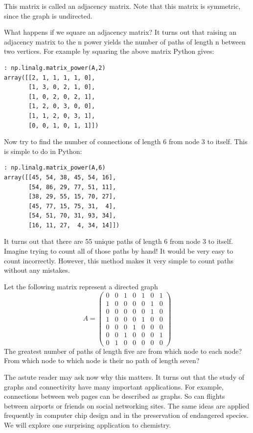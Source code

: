 This matrix is called an adjacency matrix. Note that this matrix is symmetric, since the graph is undirected.

What happens if we square an adjacency matrix? It turns out that raising an adjacency matrix to the n power yields the number of paths of length n between two vertices. For example by squaring the above matrix Python gives:
\begin{lstlisting}[style=python]
: np.linalg.matrix_power(A,2)
array([[2, 1, 1, 1, 1, 0],
       [1, 3, 0, 2, 1, 0],
       [1, 0, 2, 0, 2, 1],
       [1, 2, 0, 3, 0, 0],
       [1, 1, 2, 0, 3, 1],
       [0, 0, 1, 0, 1, 1]])
\end{lstlisting}

Now try to find the number of connections of length 6 from node 3 to itself. This is simple to do in Python:
\begin{lstlisting}[style=python]
: np.linalg.matrix_power(A,6)
array([[45, 54, 38, 45, 54, 16],
       [54, 86, 29, 77, 51, 11],
       [38, 29, 55, 15, 70, 27],
       [45, 77, 15, 75, 31,  4],
       [54, 51, 70, 31, 93, 34],
       [16, 11, 27,  4, 34, 14]])
\end{lstlisting}
It turns out that there are 55 unique paths of length 6 from node 3 to itself. Imagine trying to count all of those paths by hand! It would be very easy to count incorrectly. However, this method makes it very simple to count paths without any mistakes.

\begin{problem}
Let the following matrix represent a directed graph
\[
A = \begin{pmatrix}
0 & 0 & 1 & 0 & 1 & 0 & 1\\
1 & 0 & 0 & 0 & 0 & 1 & 0\\
0 & 0 & 0 & 0 & 0 & 1 & 0\\
1 & 0 & 0 & 0 & 1 & 0 & 0\\
0 & 0 & 0 & 1 & 0 & 0 & 0\\
0 & 0 & 1  & 0 & 0& 0 & 1\\
0 & 1 & 0 & 0 & 0 & 0 & 0
\end{pmatrix}
\]
The greatest number of paths of length five are from which node to each node? From which node to which node is their no path of length seven?
\end{problem}

The astute reader may ask now why this matters. It turns out that the study of graphs and connectivity have many important applications. For example, connections between web pages can be described as graphs. So can flights between airports or friends on social networking sites. The same ideas are applied frequently in computer chip design and in the preservation of endangered species. We will explore one surprising application to chemistry.

